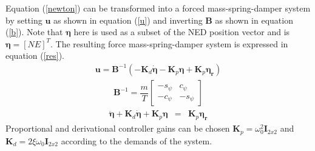 Equation (\ref{newton}) can be transformed into a forced mass-spring-damper system by setting $\boldsymbol{u}$ as shown in equation (\ref{u}) and inverting $\boldsymbol{B}$ as shown in equation (\ref{b}). Note that $\boldsymbol{\eta}$ here is used as a subset of the NED position vector and is $\boldsymbol{\eta} = [N E]^T$. The resulting force mass-spring-damper system is expressed in equation (\ref{res}).
\begin{eqnarray}
\boldsymbol{u} = \boldsymbol{B}^{-1}(-\boldsymbol{K}_d\dot{\boldsymbol{\eta}} - \boldsymbol{K}_p\boldsymbol{\eta} + \boldsymbol{K}_p\boldsymbol{\eta_r})
\label{u}
\end{eqnarray}
\begin{eqnarray}
\boldsymbol{B}^{-1} = \dfrac{m}{T}\begin{bmatrix}
-s_\psi & c_\psi\\
-c_\psi & -s_\psi
\end{bmatrix}
\label{b}
\end{eqnarray}
\begin{eqnarray}
\ddot{\boldsymbol{\eta}} + \boldsymbol{K}_d\dot{\boldsymbol{\eta}} + \boldsymbol{K}_p\boldsymbol{\eta} &=& \boldsymbol{K}_p \boldsymbol{\eta_r}
\label{res}
\end{eqnarray}
Proportional and derivational controller gains can be chosen $\boldsymbol{K}_p = \omega_0^2\boldsymbol{I}_{2x2}$ and $\boldsymbol{K}_d = 2\xi\omega_0\boldsymbol{I}_{2x2}$ according to the demands of the system.
